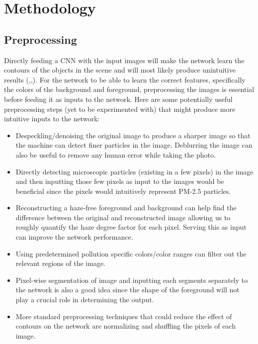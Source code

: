 \documentclass{article}
\begin{document}
\section{Methodology}
\label{sec:Methodology}

\subsection{Preprocessing}

Directly feeding a CNN with the input images will make the network learn the contours of the objects in the scene and will most likely produce unintuitive results (\cite{PPconv},\cite{EAPconv},\cite{IBAQconv}). For the network to be able to learn the correct features, specifically the colors of the background and foreground, preprocessing the images is essential before feeding it as inputs to the network. Here are some potentially useful preprocessing steps (yet to be experimented with) that might produce more intuitive inputs to the network:

\begin{itemize}
    \item Despeckling/denoising the original image to produce a sharper image so that the machine can detect finer particles in the image. Deblurring the image can also be useful to remove any human error while taking the photo.
    \item Directly detecting microscopic particles (existing in a few pixels) in the image and then inputting those few pixels as input to the images would be beneficial since the pixels would intuitively represent PM-2.5 particles.
    \item Reconstructing a haze-free foreground and background can help find the difference between the original and reconstructed image allowing us to roughly quantify the haze degree factor for each pixel. Serving this as input can improve the network performance.
    \item Using predetermined pollution specific colors/color ranges can filter out the relevant regions of the image.
    \item Pixel-wise segmentation of image and inputting each segments separately to the network is also a good idea since the shape of the foreground will not play a crucial role in determining the output.
    \item More standard preprocessing techniques that could reduce the effect of contours on the network are normalizing and shuffling the pixels of each image.
\end{itemize}
\end{document}
